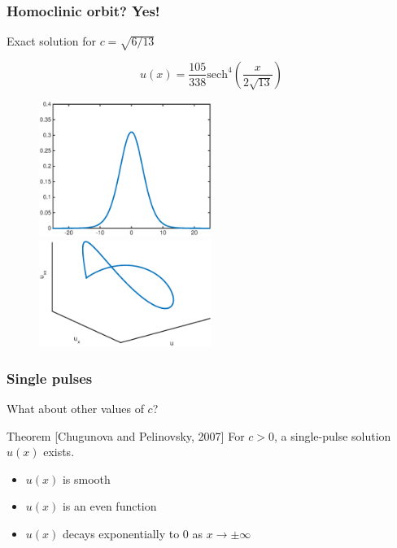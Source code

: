\documentclass[16pt]{beamer}
\begin{document}
\begin{frame}
	\frametitle{Homoclinic orbit? Yes!}
	\fontsize{16}{7.2}\selectfont
	Exact solution for $c = \sqrt{6/13}$
	\begin{center}
	\[
	u(x) = \frac{105}{338}\text{sech}^4\left( \frac{x}{2\sqrt{13}}\right) 
	\]
	\end{center}
	\begin{figure}
   		\includegraphics[width=0.5\textwidth]{images/exactsol}
   		\hfill
   		\includegraphics[width=0.5\textwidth]{images/exactsolorbit}
	\end{figure}
\end{frame}

\begin{frame}
	\frametitle{Single pulses}
	\fontsize{16}{7.2}\selectfont
	What about other values of $c$?

	\vspace{1cm}

	\begin{block}{Theorem \footnotesize [Chugunova and Pelinovsky, 2007]}
	For $c>0$, a single-pulse solution $u(x)$ exists.
	\begin{itemize}
		\item $u(x)$ is smooth
		\item $u(x)$ is an even function
		\item $u(x)$ decays exponentially to 0 as $x \rightarrow \pm \infty$
	\end{itemize}
	\end{block}
\end{frame}
\end{document}
